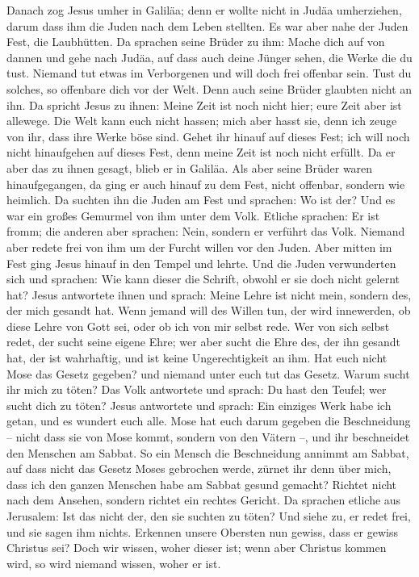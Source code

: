  Danach zog Jesus umher in Galiläa; denn er wollte nicht
in Judäa umherziehen, darum dass ihm die Juden nach dem Leben stellten.
 Es war aber nahe der Juden Fest, die Laubhütten.
 Da sprachen seine Brüder zu ihm: Mache dich auf von
dannen und gehe nach Judäa, auf dass auch deine Jünger sehen, die Werke
die du tust.  Niemand tut etwas im Verborgenen und will
doch frei offenbar sein. Tust du solches, so offenbare dich vor der
Welt.  Denn auch seine Brüder glaubten nicht an ihn.
 Da spricht Jesus zu ihnen: Meine Zeit ist noch nicht
hier; eure Zeit aber ist allewege.  Die Welt kann euch
nicht hassen; mich aber hasst sie, denn ich zeuge von ihr, dass ihre
Werke böse sind.  Gehet ihr hinauf auf dieses Fest; ich
will noch nicht hinaufgehen auf dieses Fest, denn meine Zeit ist noch
nicht erfüllt.  Da er aber das zu ihnen gesagt, blieb er
in Galiläa.  Als aber seine Brüder waren hinaufgegangen,
da ging er auch hinauf zu dem Fest, nicht offenbar, sondern wie
heimlich.  Da suchten ihn die Juden am Fest und sprachen:
Wo ist der?  Und es war ein großes Gemurmel von ihm unter
dem Volk. Etliche sprachen: Er ist fromm; die anderen aber sprachen:
Nein, sondern er verführt das Volk.  Niemand aber redete
frei von ihm um der Furcht willen vor den Juden.  Aber
mitten im Fest ging Jesus hinauf in den Tempel und lehrte.
 Und die Juden verwunderten sich und sprachen: Wie kann
dieser die Schrift, obwohl er sie doch nicht gelernt hat?
 Jesus antwortete ihnen und sprach: Meine Lehre ist nicht
mein, sondern des, der mich gesandt hat.  Wenn jemand
will des Willen tun, der wird innewerden, ob diese Lehre von Gott sei,
oder ob ich von mir selbst rede.  Wer von sich selbst
redet, der sucht seine eigene Ehre; wer aber sucht die Ehre des, der ihn
gesandt hat, der ist wahrhaftig, und ist keine Ungerechtigkeit an ihm.
 Hat euch nicht Mose das Gesetz gegeben? und niemand
unter euch tut das Gesetz. Warum sucht ihr mich zu töten?
 Das Volk antwortete und sprach: Du hast den Teufel; wer
sucht dich zu töten?  Jesus antwortete und sprach: Ein
einziges Werk habe ich getan, und es wundert euch alle. 
Mose hat euch darum gegeben die Beschneidung -- nicht dass sie von Mose
kommt, sondern von den Vätern --, und ihr beschneidet den Menschen am
Sabbat.  So ein Mensch die Beschneidung annimmt am
Sabbat, auf dass nicht das Gesetz Moses gebrochen werde, zürnet ihr denn
über mich, dass ich den ganzen Menschen habe am Sabbat gesund gemacht?
 Richtet nicht nach dem Ansehen, sondern richtet ein
rechtes Gericht.  Da sprachen etliche aus Jerusalem: Ist
das nicht der, den sie suchten zu töten?  Und siehe zu,
er redet frei, und sie sagen ihm nichts. Erkennen unsere Obersten nun
gewiss, dass er gewiss Christus sei?  Doch wir wissen,
woher dieser ist; wenn aber Christus kommen wird, so wird niemand
wissen, woher er ist.

